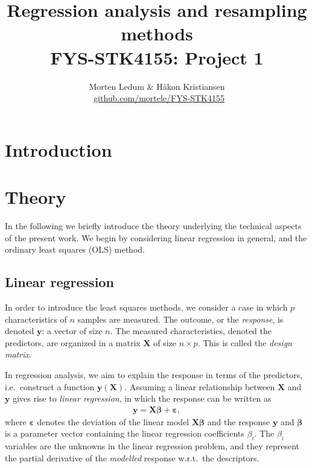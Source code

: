 \documentclass[a4paper, twocolumn]{article}
\title{{\sc Regression analysis and resampling methods \\ {\large FYS-STK4155: Project 1}}}
\author{Morten Ledum \& Håkon Kristiansen \\ \faGithub \ {\small \url{github.com/mortele/FYS-STK4155}}}
\begin{document}
\newpage

\section{Introduction}
\lipsum[3]

\section{Theory}
In the following we briefly introduce the theory underlying the technical aspects of the present work. We begin by considering linear regression in general, and the ordinary least squares (OLS) method.

\subsection{Linear regression}
In order to introduce the least squares methods, we consider a case in which $p$ characteristics of $n$ samples are measured. The outcome, or the \textit{response}, is denoted $\mathbf{y}$: a vector of size $n$. The measured characteristics, denoted the predictors, are organized in a matrix $\mathbf{X}$ of size $n\times p$. This is called the \textit{design matrix}.

In regression analysis, we aim to explain the response in terms of the predictors, i.e.\ construct a function $\mathbf{y}(\mathbf{X})$. Assuming a linear relationship between $\mathbf{X}$ and $\mathbf{y}$ gives rise to \textit{linear regression}, in which the response can be written as 
\begin{align}
\mathbf{y}=\mathbf{X}\bm{\beta}+\bm{\varepsilon},
\end{align}
where $\bm{\varepsilon}$ denotes the deviation of the linear model $\mathbf{X}\bm{\beta}$ and the response $\mathbf{y}$ and $\bm{\beta}$ is a parameter vector containing the linear regression coefficients $\beta_i$. The $\beta_i$ variables are the unknowns in the linear regression problem, and they represent the partial derivative of the \textit{modelled} response w.r.t.\ the descriptors. 
\end{document}

